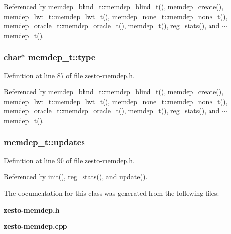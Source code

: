 Referenced by memdep\_\-blind\_\-t::memdep\_\-blind\_\-t(), memdep\_\-create(), memdep\_\-lwt\_\-t::memdep\_\-lwt\_\-t(), memdep\_\-none\_\-t::memdep\_\-none\_\-t(), memdep\_\-oracle\_\-t::memdep\_\-oracle\_\-t(), memdep\_\-t(), reg\_\-stats(), and $\sim$memdep\_\-t().
\subsubsection[{type}]{\setlength{\rightskip}{0pt plus 5cm}char$\ast$ {\bf memdep\_\-t::type}\hspace{0.3cm}{\tt  [protected]}}\label{classmemdep__t_81551a09aafb6a131f7d821fe1c8d140}




Definition at line 87 of file zesto-memdep.h.

Referenced by memdep\_\-blind\_\-t::memdep\_\-blind\_\-t(), memdep\_\-create(), memdep\_\-lwt\_\-t::memdep\_\-lwt\_\-t(), memdep\_\-none\_\-t::memdep\_\-none\_\-t(), memdep\_\-oracle\_\-t::memdep\_\-oracle\_\-t(), memdep\_\-t(), reg\_\-stats(), and $\sim$memdep\_\-t().
\subsubsection[{updates}]{ {\bf memdep\_\-t::updates}\hspace{0.3cm}{\tt  [protected]}}\label{classmemdep__t_5084813349361624222766d24ca0192c}




Definition at line 90 of file zesto-memdep.h.

Referenced by init(), reg\_\-stats(), and update().

The documentation for this class was generated from the following files:\begin{CompactItemize}
\item 
{\bf zesto-memdep.h}\item 
{\bf zesto-memdep.cpp}\end{CompactItemize}
